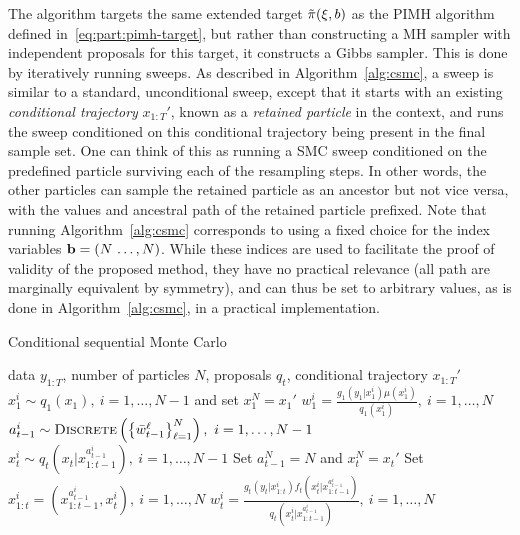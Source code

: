 The \pg algorithm targets the same extended target $\tilde{\pi}(\mathbf{\xi},b)$ as the PIMH algorithm defined
in~\eqref{eq:part:pimh-target}, but rather than constructing a MH sampler with independent proposals for
this target, it constructs a Gibbs sampler.  This is done by iteratively 
running \csmc sweeps. As described in Algorithm~\ref{alg:csmc},
a \csmc sweep is similar to a standard, unconditional \smc sweep, except that it starts
with an existing \emph{conditional trajectory} $x_{1:T}'$, known as a \emph{retained particle} in the \pg
context, and runs the sweep conditioned on this conditional trajectory being present in the final sample
set.  One can think of this as running a SMC sweep conditioned on the predefined particle surviving each
of the resampling steps.  In other words, the other particles can sample the retained particle as an
ancestor but not vice versa, with the values and ancestral path of the retained particle prefixed. 
Note that running Algorithm~\ref{alg:csmc} corresponds to using a fixed
choice for the index variables $\mathbf{b} = (N\,\ldots,N)$. While these indices are used to facilitate the
proof of validity of the proposed method, they have no practical relevance (all path are marginally equivalent
by symmetry), and can thus be set to arbitrary
values, as is done in Algorithm~\ref{alg:csmc}, in a practical implementation.
\begin{algorithm}[tb]
	\caption{Conditional sequential Monte Carlo}
	\label{alg:csmc}
	\begin{spacing}{1.2}
		\begin{algorithmic}[1]
			\renewcommand{\algorithmicrequire}{\textbf{Inputs:}}
			\renewcommand{\algorithmicensure}{\textbf{Outputs:}}				 
			\Require data $y_{1:T}$, number of particles $N$, proposals $q_t$, conditional trajectory $x_{1:T}'$
			\State $x_1^i \sim q_1(x_1), ~i=1,\ldots,N-1$ and set $x_1^N = x_1'$
			\State $w_1^i = \frac{g_1(y_1|x_1^i) \mu(x_1^i)}{q_1(x_1^i)}, ~i=1,\ldots,N$
			\State $a_{t-1}^i \sim \operatorname*{\textsc{Discrete}}\left(\left\{\bar w_{t-1}^\ell\right\}_{\ell=1}^N\right), ~i=1,\ldots,N-1$
			\State $x_t^i \sim q_t(x_t | x_{1:t-1}^{a_{t-1}^i}), ~i=1,\ldots,N-1$
			\State Set $a_{t-1}^N = N$ and $x_t^N = x_t'$
			\State Set $x_{1:t}^i = (x_{1:t-1}^{a_{t-1}^i},x_t^i), ~i=1,\ldots,N$
			\State $w_t^i = \frac{g_t(y_t|x_{1:t}^i) f_t(x_t^i | x_{1:t-1}^{a_{t-1}^i})}{q_t(x_t^i|x_{1:t-1}^{a_{t-1}^i})}, ~i=1,\ldots,N$
			\EndFor
		\end{algorithmic}
	\end{spacing}
\end{algorithm}

